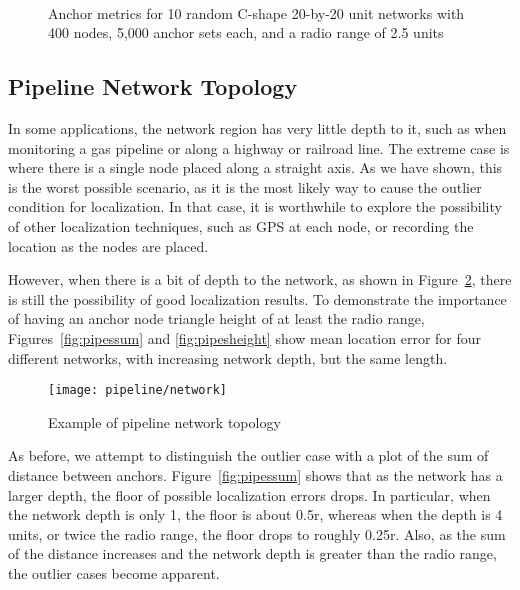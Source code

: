 \begin{figure}
  \centering
	\\
	\caption[Anchor metrics for a C-Shape topology]{Anchor metrics for 10 random C-shape 20-by-20 unit networks with 400 nodes, 5,000 anchor sets each, and a radio range of 2.5 units}
	\label{fig:cindicator}
\end{figure}

\subsection{Pipeline Network Topology}

In some applications, the network region has very little depth to it, such as when monitoring a gas pipeline or along a highway or railroad line.  The extreme case is where there is a single node placed along a straight axis.  As we have shown, this is the worst possible scenario, as it is the most likely way to cause the outlier condition for localization.  In that case, it is worthwhile to explore the possibility of other localization techniques, such as GPS at each node, or recording the location as the nodes are placed.

However, when there is a bit of depth to the network, as shown in Figure~\ref{fig:pipeline}, there is still the possibility of good localization results.  To demonstrate the importance of having an anchor node triangle height of at least the radio range, Figures~\ref{fig:pipessum} and \ref{fig:pipesheight} show mean location error for four different networks, with increasing network depth, but the same length.  

\begin{figure}
  \centering
	\texttt{[image: pipeline/network]}
	\caption{Example of pipeline network topology}
	\label{fig:pipeline}
\end{figure}

As before, we attempt to distinguish the outlier case with a plot of the sum of distance between anchors. Figure~\ref{fig:pipessum} shows that as the network has a larger depth, the floor of possible localization errors drops.  In particular, when the network depth is only 1, the floor is about 0.5r, whereas when the depth is 4 units, or twice the radio range, the floor drops to roughly 0.25r.  Also, as the sum of the distance increases and the network depth is greater than the radio range, the outlier cases become apparent.  

